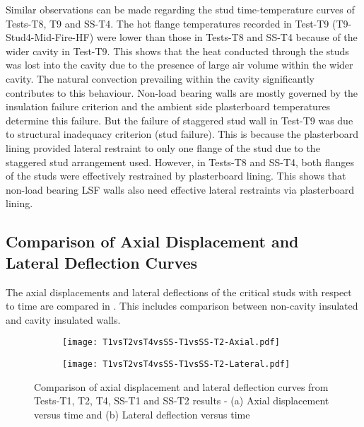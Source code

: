 Similar observations can be made regarding the stud time-temperature curves of Tests-T8, T9 and SS-T4. The hot flange temperatures recorded in Test-T9 (T9-Stud4-Mid-Fire-HF) were lower than those in Tests-T8 and SS-T4 because of the wider cavity in Test-T9. This shows that the heat conducted through the studs was lost into the cavity due to the presence of large air volume within the wider cavity. The natural convection prevailing within the cavity significantly contributes to this behaviour. Non-load bearing walls are mostly governed by the insulation failure criterion and the ambient side plasterboard temperatures determine this failure. But the failure of staggered stud wall in Test-T9 was due to structural inadequacy criterion (stud failure). This is because the plasterboard lining provided lateral restraint to only one flange of the stud due to the staggered stud arrangement used. However, in Tests-T8 and SS-T4, both flanges of the studs were effectively restrained by plasterboard lining. This shows that non-load bearing LSF walls also need effective lateral restraints via plasterboard lining.

\subsection[Comparison of Axial Displacement and Lateral Deflection Curves]{Comparison of Axial Displacement and \\Lateral Deflection Curves}

The axial displacements and lateral deflections of the critical studs with respect to time are compared in . This includes comparison between non-cavity insulated and cavity insulated walls. 
\begin{figure}[!htbp]
	\centering
	\begin{subfigure}[b]{0.7\textwidth}
		\centering
		\texttt{[image: T1vsT2vsT4vsSS-T1vsSS-T2-Axial.pdf]}
		\caption{}
		\label{subfig:T1vsT2vsT4vsSS-T1vsSS-T2-Axial}
	\end{subfigure}
	\begin{subfigure}[b]{0.7\textwidth}
		\centering
		\texttt{[image: T1vsT2vsT4vsSS-T1vsSS-T2-Lateral.pdf]}
		\caption{}
		\label{subfig:T1vsT2vsT4vsSS-T1vsSS-T2-Lateral}
	\end{subfigure}
	   \caption{Comparison of axial displacement and lateral deflection curves from Tests-T1, T2, T4, SS-T1 and SS-T2 results - (a) Axial displacement versus time and (b) Lateral deflection versus time}
	   \label{fig:T1vsT2vsT4vsSS-T1vsSS-T2-Displacement}
\end{figure}

